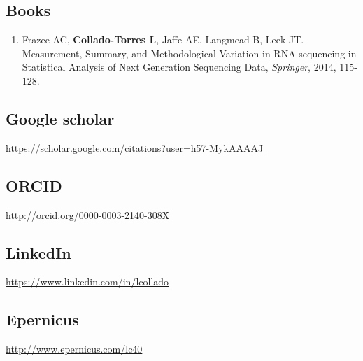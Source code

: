 \subsection{Books}
    \begin{enumerate}
        \item Frazee AC, \textbf{Collado-Torres L}, Jaffe AE, Langmead B, Leek JT. Measurement, Summary, and Methodological Variation in RNA-sequencing in Statistical Analysis of Next Generation Sequencing Data, \emph{Springer}, 2014, 115-128.
    \end{enumerate}
\subsection{Google scholar}
    \url{https://scholar.google.com/citations?user=h57-MykAAAAJ}
\subsection{ORCID}
    \url{http://orcid.org/0000-0003-2140-308X}
\subsection{LinkedIn}
    \url{https://www.linkedin.com/in/lcollado}
\subsection{Epernicus}
    \url{http://www.epernicus.com/lc40}

